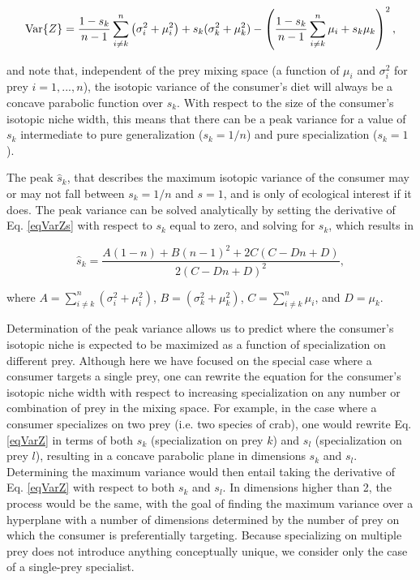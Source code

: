 \documentclass{frontiersSCNS}
\begin{document}
\begin{equation}
\label{eqVarZs}
{\rm Var}\{Z\} = \frac{1-s_k}{n-1}\sum_{i \neq k}^n \left(\sigma_i^2 + \mu_i^2\right) + s_k(\sigma_k^2 + \mu_k^2) - \left(\frac{1-s_k}{n-1}\sum_{i \neq k}^n \mu_i + s_k\mu_k \right)^2,
\end{equation}

\noindent and note that, independent of the prey mixing space (a function of $\mu_i$ and $\sigma_i^2$ for prey $i=1,...,n$), the isotopic variance of the consumer's diet will always be a concave parabolic function over $s_k$.
With respect to the size of the consumer's isotopic niche width, this means that there can be a peak variance for a value of $s_k$ intermediate to pure generalization ($s_k=1/n$) and pure specialization ($s_k=1$).

The peak $\hat s_k$, that describes the maximum isotopic variance of the consumer may or may not fall between $s_k=1/n$ and $s=1$, and is only of ecological interest if it does.
The peak variance can be solved analytically by setting the derivative of Eq. \ref{eqVarZs} with respect to $s_k$ equal to zero, and solving for $s_k$, which results in

\begin{equation}
	\hat s_k = \frac{A(1-n)+B (n-1)^2+2 C (C-D n+D)}{2 (C-D n+D)^2},
\end{equation}

\noindent where $A = \sum_{i \neq k}^n \left(\sigma_i^2 + \mu_i^2\right)$, $B = \left(\sigma_k^2 + \mu_k^2\right)$, $C = \sum_{i \neq k}^n \mu_i$, and $D = \mu_k$.

Determination of the peak variance allows us to predict where the consumer's isotopic niche is expected to be maximized as a function of specialization on different prey.
Although here we have focused on the special case where a consumer targets a single prey, one can rewrite the equation for the consumer's isotopic niche width with respect to increasing specialization on any number or combination of prey in the mixing space.
For example, in the case where a consumer specializes on two prey (i.e. two species of crab), one would rewrite Eq. \ref{eqVarZ} in terms of both $s_k$ (specialization on prey $k$) and $s_l$ (specialization on prey $l$), resulting in a concave parabolic plane in dimensions $s_k$ and $s_l$.
Determining the maximum variance would then entail taking the derivative of Eq. \ref{eqVarZ} with respect to both $s_k$ and $s_l$.
In dimensions higher than 2, the process would be the same, with the goal of finding the maximum variance over a hyperplane with a number of dimensions determined by the number of prey on which the consumer is preferentially targeting.
Because specializing on multiple prey does not introduce anything conceptually unique, we consider only the case of a single-prey specialist.
\end{document}
